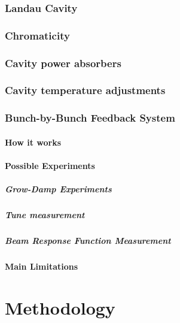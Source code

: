 \documentclass[
	12pt,				%
	openright,			%
	oneside,			%
	a4paper,		%
	chapter=TITLE,		%
	section=TITLE,		%
    brazil,				%
	english,			%
	sumario=tradicional,
	]{abntex2}
\begin{document}
    \subsection{Landau Cavity}
    \subsection{Chromaticity}
    \subsection{Cavity power absorbers}
    \subsection{Cavity temperature adjustments}
    \subsection{Bunch-by-Bunch Feedback System}
      \subsubsection{How it works}
      \subsubsection{Possible Experiments}
        \paragraph{Grow-Damp Experiments}
        \paragraph{Tune measurement}
        \paragraph{Beam Response Function Measurement}
      \subsubsection{Main Limitations}

\chapter{Methodology}
  \section{}
\end{document}
